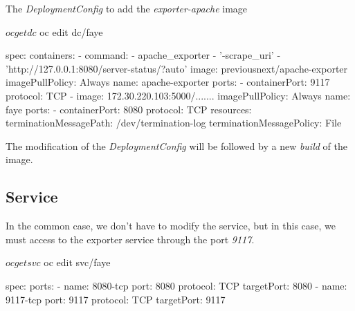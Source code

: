 The \emph{DeploymentConfig} to add the \emph{exporter-apache} image
\begin{bashcode}
$ oc get dc
$ oc edit dc/faye
\end{bashcode}

\begin{yamlcode}
  spec:
    containers:
        - command:
            - apache_exporter
            - '-scrape_uri'
            - 'http://127.0.0.1:8080/server-status/?auto'
          image: previousnext/apache-exporter
          imagePullPolicy: Always
          name: apache-exporter
          ports:
            - containerPort: 9117
              protocol: TCP
        - image: 172.30.220.103:5000/.......
          imagePullPolicy: Always
          name: faye
          ports:
            - containerPort: 8080
              protocol: TCP
          resources: {}
          terminationMessagePath: /dev/termination-log
          terminationMessagePolicy: File
\end{yamlcode}

The modification of the \emph{DeploymentConfig} will be followed by a  new \emph{build} of the image.

\subsection{Service}

In the common case, we don't have to modify the service, but in this case, we must access to the exporter service through the port \emph{9117}. 
\begin{bashcode}
  $ oc getsvc
  $ oc edit svc/faye
\end{bashcode}

\begin{yamlcode}
spec:
  ports:
    - name: 8080-tcp
      port: 8080
      protocol: TCP
      targetPort: 8080
    - name: 9117-tcp
      port: 9117
      protocol: TCP
      targetPort: 9117
\end{yamlcode}
